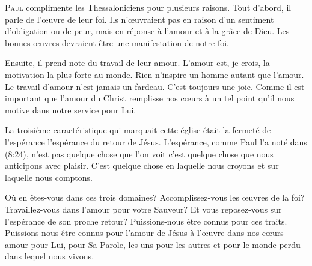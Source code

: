 \dvrule







\lettrine{P}{aul} complimente les Thessaloniciens pour plusieurs raisons.
 Tout d'abord, il parle de l'\oe{}uvre de leur foi.
 Ils n'\oe{}uvraient pas en raison d'un sentiment d'obligation ou de peur,
 mais en réponse à l'amour et à la grâce de Dieu.
 Les bonnes \oe{}uvres devraient être une manifestation de notre foi.

Ensuite, il prend note du travail de leur amour. L'amour est, je crois,
 la motivation la plus forte au monde. Rien n'inspire un homme autant
 que l'amour. Le travail d'amour n'est jamais un fardeau.
 C'est toujours une joie. Comme il est important que l'amour du Christ
 remplisse nos c\oe{}urs à un tel point qu'il nous motive dans notre service pour Lui.


La troisième caractéristique qui marquait cette église était la fermeté
 de l'espérance \ocadr l'espérance du retour de Jésus.
 L'espérance, comme Paul l'a noté dans (8:24),
 n'est pas quelque chose que l'on voit \ocadr c'est quelque chose que nous
 anticipons avec plaisir. C'est quelque chose en laquelle nous croyons
 et sur laquelle nous comptons.

Où en êtes-vous dans ces trois domaines? Accomplissez-vous
 les \oe{}uvres de la foi? Travaillez-vous dans l'amour pour votre Sauveur?
 Et vous reposez-vous sur l'espérance de son proche retour?
 Puissions-nous être connus pour ces traits. Puissions-nous être connus
 pour l'amour de Jésus à l'\oe{}uvre dans nos c\oe{}urs
 \ocadr amour pour Lui, pour Sa Parole, les uns pour les autres
 et pour le monde perdu dans lequel nous vivons.

\dvrule

